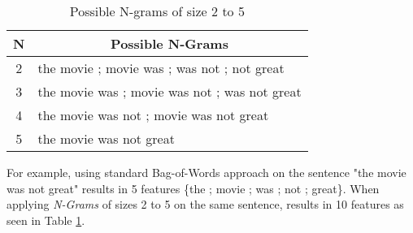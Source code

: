 			\begin{table}[h]	
				\begin{center}
					\begin{tabular}{c l} 
						\hline\hline
						N &  \multicolumn{1}{c}{Possible N-Grams }  \\ 
						\hline
						2 & the movie ; movie was ; was not ; not great  \\
						3 & the movie was ; movie was not ; was not great \\
						4 & the movie was not ; movie was not great \\
						5 & the movie was not great \\ 
						\hline\hline
					\end{tabular}
				\end{center}
				\caption[N-Gram Example]{Possible N-grams of size 2 to 5 }
				\label{table:ngrams}
			\end{table}
			
			For example, using standard Bag-of-Words approach on the sentence "the movie was not great" results in 5 features \{the ; movie ; was ; not ; great\}. When applying \textit{N-Grams} of sizes 2 to 5 on the same sentence, results in 10 features as seen in Table \ref{table:ngrams}.
			
